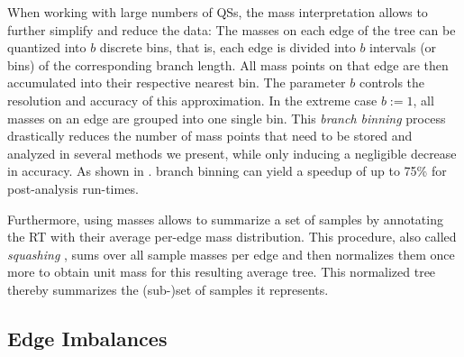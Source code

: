 When working with large numbers of \acp{QS},
the mass interpretation allows to further simplify and reduce the data:
The masses on each edge of the tree can be quantized into $b$ discrete bins,
that is, each edge is divided into $b$ intervals (or bins) of the corresponding branch length.
All mass points on that edge are then accumulated into their respective nearest bin.
The parameter $b$ controls the resolution and accuracy of this approximation.
In the extreme case $b:=1$, all masses on an edge are grouped into one single bin.
This \emph{branch binning} process drastically reduces the number of mass points
that need to be stored and analyzed in several methods we present,
while only inducing a negligible decrease in accuracy.
As shown in .
branch binning can yield a speedup of up to 75\% for post-analysis run-times.

Furthermore, using masses allows to summarize a set of samples
by annotating the \ac{RT} with their average per-edge mass distribution.
This procedure, also called \emph{squashing} \cite{Matsen2011a}, sums over all sample masses per edge
and then normalizes them once more to obtain unit mass for this resulting average tree.
This normalized tree thereby summarizes the (sub-)set of samples it represents.


\subsection{Edge Imbalances}
\label{ch:Foundations:sec:PhylogeneticPlacementProcessing:sub:EdgeImbalances}

